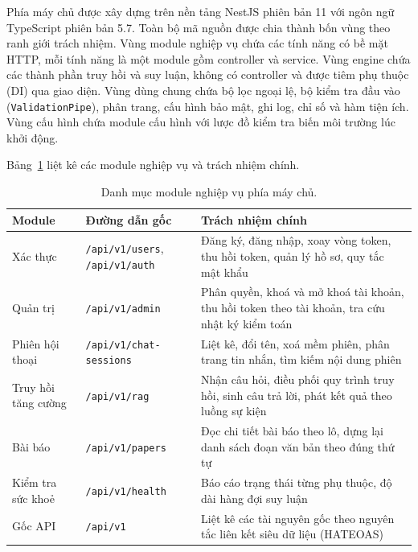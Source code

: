 Phía máy chủ được xây dựng trên nền tảng NestJS phiên bản 11 với ngôn ngữ TypeScript phiên bản 5.7. Toàn bộ mã nguồn được chia thành bốn vùng theo ranh giới trách nhiệm. Vùng module nghiệp vụ chứa các tính năng có bề mặt HTTP, mỗi tính năng là một module gồm controller và service. Vùng engine chứa các thành phần truy hồi và suy luận, không có controller và được tiêm phụ thuộc (DI) qua giao diện. Vùng dùng chung chứa bộ lọc ngoại lệ, bộ kiểm tra đầu vào (\texttt{ValidationPipe}), phân trang, cấu hình bảo mật, ghi log, chỉ số và hàm tiện ích. Vùng cấu hình chứa module cấu hình với lược đồ kiểm tra biến môi trường lúc khởi động.

Bảng~\ref{tab:module-backend} liệt kê các module nghiệp vụ và trách nhiệm chính.

\begin{table}[htbp]
    \centering
    \caption{Danh mục module nghiệp vụ phía máy chủ.}
    \label{tab:module-backend}
    \small
    \begin{tabularx}{\textwidth}{@{}>{\raggedright\arraybackslash}p{2.6cm}>{\raggedright\arraybackslash}p{4.5cm}>{\raggedright\arraybackslash}X@{}}
        \toprule
        \textbf{Module} & \textbf{Đường dẫn gốc} & \textbf{Trách nhiệm chính} \\
        \midrule
        Xác thực & \texttt{/api/v1/users}, \texttt{/api/v1/auth} & Đăng ký, đăng nhập, xoay vòng token, thu hồi token, quản lý hồ sơ, quy tắc mật khẩu \\
        Quản trị & \texttt{/api/v1/admin} & Phân quyền, khoá và mở khoá tài khoản, thu hồi token theo tài khoản, tra cứu nhật ký kiểm toán \\
        Phiên hội thoại & \texttt{/api/v1/chat-sessions} & Liệt kê, đổi tên, xoá mềm phiên, phân trang tin nhắn, tìm kiếm nội dung phiên \\
        Truy hồi tăng cường & \texttt{/api/v1/rag} & Nhận câu hỏi, điều phối quy trình truy hồi, sinh câu trả lời, phát kết quả theo luồng sự kiện \\
        Bài báo & \texttt{/api/v1/papers} & Đọc chi tiết bài báo theo lô, dựng lại danh sách đoạn văn bản theo đúng thứ tự \\
        Kiểm tra sức khoẻ & \texttt{/api/v1/health} & Báo cáo trạng thái từng phụ thuộc, độ dài hàng đợi suy luận \\
        Gốc API & \texttt{/api/v1} & Liệt kê các tài nguyên gốc theo nguyên tắc liên kết siêu dữ liệu (HATEOAS) \\
        \bottomrule
    \end{tabularx}
\end{table}

